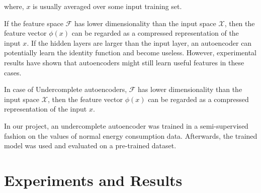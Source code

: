 \documentclass[conference]{IEEEtran}
\begin{document}
where, $x$ is usually averaged over some input training set.

If the feature space $\mathcal{F}$  has lower dimensionality than the input space $\mathcal{X}$, then the feature vector $\phi(x)$ can be regarded as a compressed representation of the input $x$.  If the hidden layers are larger than the input layer, an autoencoder can potentially learn the identity function and become useless. However, experimental results have shown that autoencoders might still learn useful features in these cases.


In case of Undercomplete autoencoders, $\mathcal{F}$ has lower dimensionality than the input space $\mathcal{X}$, then the feature vector $\phi(x)$  can be regarded as a compressed representation of the input $x$.

In our project, an undercomplete autoencoder was trained in a semi-supervised fashion on the values of normal energy consumption data. Afterwards, the trained model was used and evaluated on a pre-trained dataset. 


\section{\label{sec:level1}	Experiments and Results}
\end{document}
